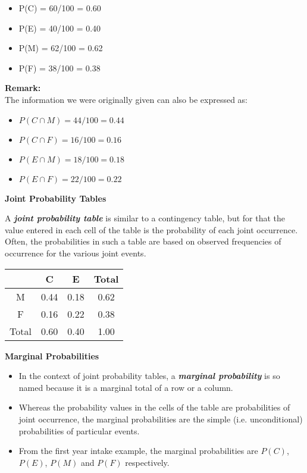 {{\begin{multicols}{2}
	\begin{itemize}
		\item P(C) = 60/100 = 0.60
		\item P(E) = 40/100 = 0.40
		\item P(M) = 62/100 = 0.62
		\item P(F) = 38/100 = 0.38
	\end{itemize}
	\end{multicols}
}
\noindent 	\textbf{Remark:}\\
	The information we were originally given can also be expressed as:
\begin{multicols}{2}
\begin{itemize}
		\item $P(C \cap M) = 44/100 = 0.44$
		\item $P(C \cap F) = 16/100 = 0.16$
		\item $P(E \cap M) = 18/100 = 0.18$
		\item $P(E \cap F) = 22/100 = 0.22$
\end{itemize}
\end{multicols}
	\noindent \textbf{Joint Probability Tables}
	
	A \textbf{\emph{joint probability table}} is similar to a contingency table, but for that the value entered in
	each cell of the table is the probability of each joint occurrence. Often, the probabilities in such a table are based
	on observed frequencies of occurrence for the various joint events.
	\begin{center}
		\begin{tabular}{|c||c|c||c|}
			\hline
			& C & E & Total \\ \hline \hline
			M & 0.44 & 0.18 & 0.62 \\ \hline
			F & 0.16 & 0.22 & 0.38 \\ \hline \hline
			Total & 0.60 & 0.40 & 1.00 \\ \hline
		\end{tabular}
	\end{center}
}
{
	\noindent \textbf{Marginal Probabilities}
	\begin{itemize}
		\item In the context of joint probability tables, a  \textbf{\emph{marginal probability}} is so named because it is a marginal total of
		a row or a column. \item Whereas the probability values in the cells of the table are probabilities of joint occurrence, the marginal
		probabilities are the simple (i.e. unconditional) probabilities of particular events.
		\item From the first year intake example, the marginal probabilities are $P(C)$, $P(E)$, $P(M)$ and $P(F)$ respectively.
	\end{itemize}
	
}
